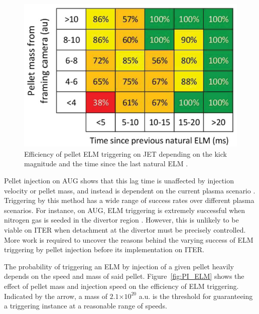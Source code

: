 \documentclass[11pt, twocolumn]{article}  %
\providecommand{\e}[1]{\ensuremath{\times 10^{#1}}} %
\begin{document}
\begin{figure}
\includegraphics[scale=0.45]{Figures/PI_ELMprob.png}
\centering
\caption{Efficiency of pellet ELM triggering on JET depending on the kick magnitude and the time since the last natural ELM \cite{Chapman2016}.}\label{fig:PI_ELMprob}
\end{figure}

Pellet injection on AUG shows that this lag time is unaffected by injection velocity or pellet mass, and instead is dependent on the current plasma scenario \cite{Lang2014}. Triggering by this method has a wide range of success rates over different plasma scenarios. For instance, on AUG, ELM triggering is extremely successful when nitrogen gas is seeded in the divertor region \cite{Kallenbach2012}. However, this is unlikely to be viable on ITER when detachment at the divertor must be precisely controlled. More work is required to uncover the reasons behind the varying success of ELM triggering by pellet injection before its implementation on ITER.

The probability of triggering an ELM by injection of a given pellet heavily depends on the speed and mass of said pellet. Figure~\ref{fig:PI_ELM} shows the effect of pellet mass and injection speed on the efficiency of ELM triggering. Indicated by the arrow, a mass of $2.1\e{20}$ a.u. is the threshold for guaranteeing a triggering instance at a reasonable range of speeds.
\end{document}
